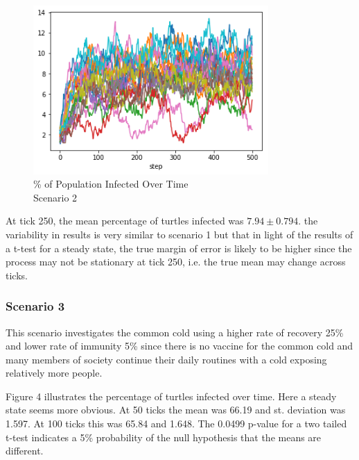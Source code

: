 \documentclass[11pt]{article} %
\begin{document}
\begin{figure}
\centering
\includegraphics[width=0.8\textwidth]{20-runs-scenario-2-steady-state}
\caption{\% of Population Infected Over Time \\ Scenario 2}
\end{figure}



At tick 250, the mean percentage of turtles infected was $7.94 \pm 0.794$. the variability in results is very similar to scenario 1 but that in light of the results of a t-test for a steady state, the true margin of error is likely to be higher since the process may not be stationary at tick 250, i.e. the true mean may change across ticks.  

\subsubsection{Scenario 3}


This scenario investigates the common cold using a higher rate of recovery 25\% and lower rate of immunity 5\% since there is no vaccine for the common cold and many members of society continue their daily routines with a cold exposing relatively more people. 


Figure 4 illustrates the percentage of turtles infected over time. Here a steady state seems more obvious. At 50 ticks the mean was 66.19 and st. deviation was 1.597. At 100 ticks this was 65.84 and 1.648. The 0.0499 p-value for a two tailed t-test indicates a 5\% probability of the null hypothesis that the means are different.
\end{document}
